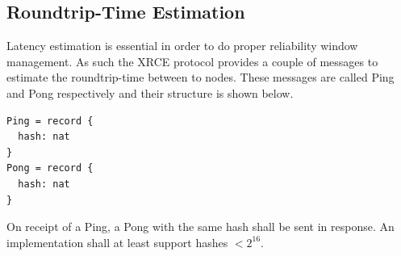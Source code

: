 \documentclass[a4paper,oneside,article]{memoir}
\begin{document}
\subsection{Roundtrip-Time Estimation}

Latency estimation is essential in order to do proper reliability window management.  As such the
XRCE protocol provides a couple of messages to estimate the roundtrip-time between to nodes.  These
messages are called Ping and Pong respectively and their structure is shown below.
\begin{verbatim}
Ping = record {
  hash: nat
}
Pong = record {
  hash: nat
}
\end{verbatim}
On receipt of a Ping, a Pong with the same hash shall be sent in response.  An implementation shall
at least support hashes $< 2^{16}$.
\end{document}
